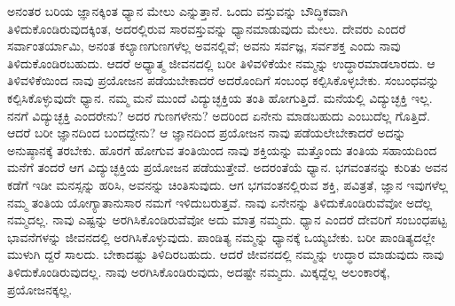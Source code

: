 ಅನಂತರ ಬರಿಯ ಜ್ಞಾನಕ್ಕಿಂತ ಧ್ಯಾನ ಮೇಲು ಎನ್ನುತ್ತಾನೆ. ಒಂದು ವಸ್ತುವನ್ನು ಬೌದ್ಧಿಕವಾಗಿ ತಿಳಿದುಕೊಂಡಿರುವುದಕ್ಕಿಂತ, ಅದರಲ್ಲಿರುವ ಸಾರವಸ್ತುವನ್ನು ಧ್ಯಾನಮಾಡುವುದು ಮೇಲು. ದೇವರು ಎಂದರೆ ಸರ್ವಾಂತರ್ಯಾಮಿ, ಅನಂತ ಕಲ್ಯಾಣಗುಣಗಳೆಲ್ಲ ಅವನಲ್ಲಿವೆ; ಅವನು ಸರ್ವಜ್ಞ, ಸರ್ವಶಕ್ತ ಎಂದು ನಾವು ತಿಳಿದುಕೊಂಡಿರಬಹುದು. ಆದರೆ ಅಧ್ಯಾತ್ಮ ಜೀವನದಲ್ಲಿ ಬರೀ ತಿಳಿವಳಿಕೆಯೇ ನಮ್ಮನ್ನು ಉದ್ಧಾರಮಾಡಲಾರದು. ಆ ತಿಳಿವಳಿಕೆಯಿಂದ ನಾವು ಪ್ರಯೋಜನ ಪಡೆಯಬೇಕಾದರೆ ಅದರೊಂದಿಗೆ ಸಂಬಂಧ ಕಲ್ಪಿಸಿಕೊಳ್ಳಬೇಕು. ಸಂಬಂಧವನ್ನು ಕಲ್ಪಿಸಿಕೊಳ್ಳುವುದೇ ಧ್ಯಾನ. ನಮ್ಮ ಮನೆ ಮುಂದೆ ವಿದ್ಯುಚ್ಛಕ್ತಿಯ ತಂತಿ ಹೋಗುತ್ತಿದೆ. ಮನೆಯಲ್ಲಿ ವಿದ್ಯುಚ್ಛಕ್ತಿ ಇಲ್ಲ. ನನಗೆ ವಿದ್ಯುಚ್ಛಕ್ತಿ ಎಂದರೇನು? ಅದರ ಗುಣಗಳೇನು? ಅದರಿಂದ ಏನೇನು ಮಾಡಬಹುದು ಎಂಬುದೆಲ್ಲ ಗೊತ್ತಿದೆ. ಆದರೆ ಬರೀ ಜ್ಞಾನದಿಂದ ಬಂದದ್ದೇನು? ಆ ಜ್ಞಾನದಿಂದ ಪ್ರಯೋಜನ ನಾವು ಪಡೆಯಲೇಬೇಕಾದರೆ ಅದನ್ನು ಅನುಷ್ಠಾನಕ್ಕೆ ತರಬೇಕು. ಹೊರಗೆ ಹೋಗುವ ತಂತಿಯಿಂದ ನಾವು ಶಕ್ತಿಯನ್ನು ಮತ್ತೊಂದು ತಂತಿಯ ಸಹಾಯದಿಂದ ಮನೆಗೆ ತಂದರೆ ಆಗ ವಿದ್ಯುಚ್ಛಕ್ತಿಯ ಪ್ರಯೋಜನ ಪಡೆಯುತ್ತೇವೆ. ಅದರಂತೆಯೆ ಧ್ಯಾನ. ಭಗವಂತನನ್ನು ಕುರಿತು ಅವನ ಕಡೆಗೆ ಇಡೀ ಮನಸ್ಸನ್ನು ಹರಿಸಿ, ಅವನನ್ನು ಚಿಂತಿಸುವುದು. ಆಗ ಭಗವಂತನಲ್ಲಿರುವ ಶಕ್ತಿ, ಪವಿತ್ರತೆ, ಜ್ಞಾನ ಇವುಗಳೆಲ್ಲ ನಮ್ಮ ತಂತಿಯ ಯೋಗ್ಯಾತಾನುಸಾರ ನಮಗೆ ಇಳಿದುಬರುತ್ತವೆ. ನಾವು ಏನೇನನ್ನು ತಿಳಿದುಕೊಂಡಿರುವೆವೋ ಅದೆಲ್ಲ ನಮ್ಮದಲ್ಲ. ನಾವು ಎಷ್ಟನ್ನು ಅರಗಿಸಿಕೊಂಡಿರುವೆವೋ ಅದು ಮಾತ್ರ ನಮ್ಮದು. ಧ್ಯಾನ ಎಂದರೆ ದೇವರಿಗೆ ಸಂಬಂಧಪಟ್ಟ ಭಾವನೆಗಳನ್ನು ಜೀವನದಲ್ಲಿ ಅರಗಿಸಿಕೊಳ್ಳುವುದು. ಪಾಂಡಿತ್ಯ ನಮ್ಮನ್ನು ಧ್ಯಾನಕ್ಕೆ ಒಯ್ಯಬೇಕು. ಬರೀ ಪಾಂಡಿತ್ಯದಲ್ಲೇ ಮುಳುಗಿ ದ್ದರೆ ಸಾಲದು. ಬೇಕಾದಷ್ಟು ತಿಳಿದಿರಬಹುದು. ಆದರೆ ಜೀವನದಲ್ಲಿ ನಮ್ಮನ್ನು ಉದ್ಧಾರ ಮಾಡುವುದು ನಾವು ತಿಳಿದುಕೊಂಡಿರುವುದಲ್ಲ. ನಾವು ಅರಗಿಸಿಕೊಂಡಿರುವುದು, ಅದಷ್ಟೇ ನಮ್ಮದು. ಮಿಕ್ಕದ್ದೆಲ್ಲ ಅಲಂಕಾರಕ್ಕೆ, ಪ್ರಯೋಜನಕ್ಕಲ್ಲ.


